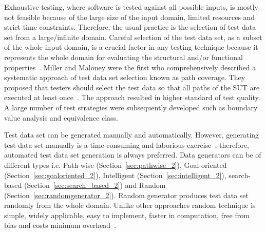 Exhaustive testing, where software is tested against all possible inputs, is mostly not feasible because of the large size of the input domain, limited resources and strict time constraints. Therefore, the usual practice is the selection of test data set from a large/infinite domain. Careful selection of the test data set, as a subset of the whole input domain, is a crucial factor in any testing technique because it represents the whole domain for evaluating the structural and/or functional properties~\cite{howden1986functional, mccabe1983structured}. Miller and Maloney were the first who comprehensively described a systematic approach of test data set selection known as path coverage. They proposed that testers should select the test data so that all paths of the SUT are executed at least once~\cite{miller1963systematic}. The approach resulted in higher standard of test quality. A large number of test strategies were subsequently developed such as boundary value analysis and equivalence class. 

Test data set can be generated manually and automatically. However, generating test data set manually is a time-consuming and laborious exercise~\cite{korel1990automated}, therefore, automated test data set generation is always preferred. Data generators can be of different types i.e. Path-wise (Section~\ref{sec:pathwise_2}), Goal-oriented (Section~\ref{sec:goaloriented_2}), Intelligent (Section~\ref{sec:intelligent_2}), search-based (Section~\ref{sec:search_based_2}) and Random (Section~\ref{sec:randomgenerator_2}). Random generator produces test data set randomly from the whole domain. Unlike other approaches random technique is simple, widely applicable, easy to implement, faster in computation, free from bias and costs minimum overhead~\cite{ciupa2007experimental}. 

